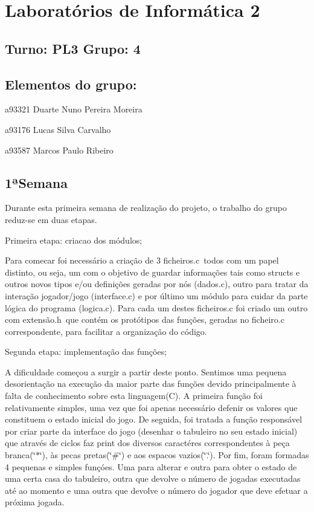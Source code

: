 \section*{Laboratórios de Informática 2}

\subsection*{Turno\+: P\+L3 Grupo\+: 4}

\subsection*{Elementos do grupo\+:}


\begin{DoxyItemize}
\item a93321 Duarte Nuno Pereira Moreira
\item a93176 Lucas Silva Carvalho
\item a93587 Marcos Paulo Ribeiro
\end{DoxyItemize}

\subsection*{1ª\+Semana}

Durante esta primeira semana de realização do projeto, o trabalho do grupo reduz-\/se em duas etapas.

Primeira etapa\+: criacao dos módulos;

Para comecar foi necessário a criação de 3 ficheiros.\+c todos com um papel distinto, ou seja, um com o objetivo de guardar informações tais como structs e outros novos tipos e/ou definições geradas por nós (dados.\+c), outro para tratar da interação jogador/jogo (interface.\+c) e por último um módulo para cuidar da parte lógica do programa (logica.\+c). Para cada um destes ficheiros.\+c foi criado um outro com extensão.\+h que contém os protótipos das funções, geradas no ficheiro.\+c correspondente, para facilitar a organização do código.

Segunda etapa\+: implementação das funções;

A dificuldade começou a surgir a partir deste ponto. Sentimos uma pequena desorientação na execução da maior parte das funções devido principalmente à falta de conhecimento sobre esta linguagem(\+C). A primeira função foi relativamente simples, uma vez que foi apenas necessário defenir os valores que constituem o estado inicial do jogo. De seguida, foi tratada a função responsável por criar parte da interface do jogo (desenhar o tabuleiro no seu estado inicial) que através de ciclos faz print dos diversos caractéres correspondentes à peça branca(\char`\"{}$\ast$\char`\"{}), às pecas pretas(\char`\"{}\#\char`\"{}) e aos espacos vazios(\char`\"{}.\char`\"{}). Por fim, foram formadas 4 pequenas e simples funçóes. Uma para alterar e outra para obter o estado de uma certa casa do tabuleiro, outra que devolve o número de jogadas executadas até ao momento e uma outra que devolve o número do jogador que deve efetuar a próxima jogada. 